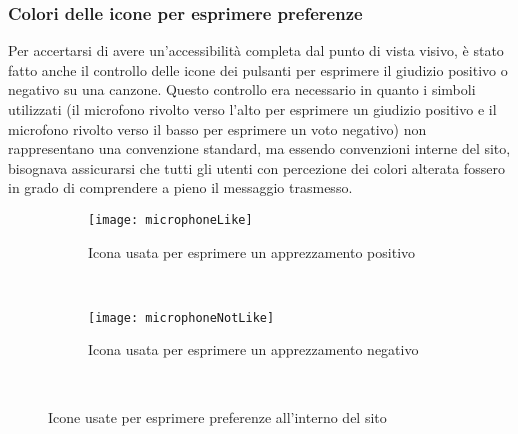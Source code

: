 \subsubsection{Colori delle icone per esprimere preferenze}
Per accertarsi di avere un'accessibilit\`a completa dal punto di vista visivo, \`e stato fatto anche il controllo delle icone dei pulsanti per esprimere il giudizio positivo o negativo su una canzone. Questo controllo era necessario in quanto i simboli utilizzati (il microfono rivolto verso l'alto per esprimere un giudizio positivo e il microfono rivolto verso il basso per esprimere un voto negativo) non rappresentano una convenzione standard, ma essendo convenzioni interne del sito, bisognava assicurarsi che tutti gli utenti con percezione dei colori alterata fossero in grado di comprendere a pieno il messaggio trasmesso.

\begin{figure}[H]
    \centering
    \begin{subfigure}[b]{0.4\textwidth}
        \texttt{[image: microphoneLike]}
        \caption{Icona usata per esprimere un apprezzamento positivo}
    \end{subfigure}
    ~
    \begin{subfigure}[b]{0.4\textwidth}
        \texttt{[image: microphoneNotLike]}
        \caption{Icona usata per esprimere un apprezzamento negativo}
    \end{subfigure}
    ~
    \caption{Icone usate per esprimere preferenze all'interno del sito}
\end{figure}


